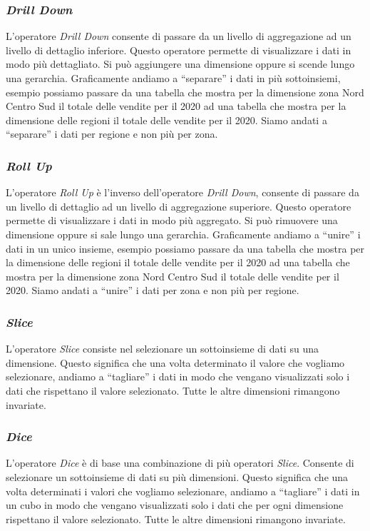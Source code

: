     \subsubsection{\textit{Drill Down}}
        L'operatore \textit{Drill Down} consente di passare da un livello di aggregazione ad un livello di dettaglio inferiore. Questo operatore permette di visualizzare i dati in modo più dettagliato. Si può aggiungere una dimensione oppure si scende lungo una gerarchia. Graficamente andiamo a ``separare'' i dati in più sottoinsiemi, esempio possiamo passare da una tabella che mostra per la dimensione zona Nord Centro Sud il totale delle vendite per il 2020 ad una tabella che mostra per la dimensione delle regioni il totale delle vendite per il 2020. Siamo andati a ``separare'' i dati per regione e non più per zona.
    \subsubsection{\textit{Roll Up}}
        L'operatore \textit{Roll Up} è l'inverso dell'operatore \textit{Drill Down}, consente di passare da un livello di dettaglio ad un livello di aggregazione superiore. Questo operatore permette di visualizzare i dati in modo più aggregato. Si può rimuovere una dimensione oppure si sale lungo una gerarchia. Graficamente andiamo a ``unire'' i dati in un unico insieme, esempio possiamo passare da una tabella che mostra per la dimensione delle regioni il totale delle vendite per il 2020 ad una tabella che mostra per la dimensione zona Nord Centro Sud il totale delle vendite per il 2020. Siamo andati a ``unire'' i dati per zona e non più per regione.
    \subsubsection{\textit{Slice}}
        L'operatore \textit{Slice} consiste nel selezionare un sottoinsieme di dati su una dimensione. Questo significa che una volta determinato il valore che vogliamo selezionare, andiamo a ``tagliare'' i dati in modo che vengano visualizzati solo i dati che rispettano il valore selezionato. Tutte le altre dimensioni rimangono invariate.
    \subsubsection{\textit{Dice}}
        L'operatore \textit{Dice} è di base una combinazione di più operatori \textit{Slice}. Consente di selezionare un sottoinsieme di dati su più dimensioni. Questo significa che una volta determinati i valori che vogliamo selezionare, andiamo a ``tagliare'' i dati in un cubo in modo che vengano visualizzati solo i dati che per ogni dimensione rispettano il valore selezionato. Tutte le altre dimensioni rimangono invariate.
